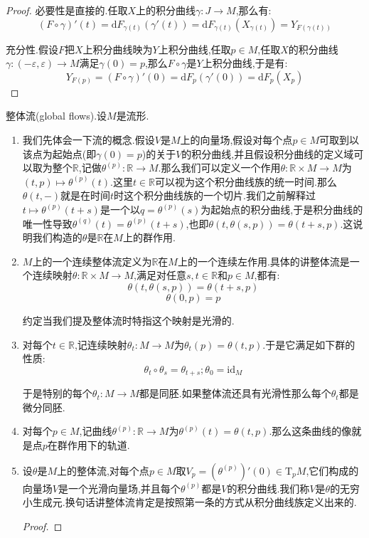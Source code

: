 \begin{enumerate}
\begin{proof}
		必要性是直接的.任取$X$上的积分曲线$\gamma:J\to M$,那么有:
		$$(F\circ\gamma)'(t)=\mathrm{d}F_{\gamma(t)}(\gamma'(t))=\mathrm{d}F_{\gamma(t)}(X_{\gamma(t)})=Y_{F(\gamma(t))}$$
		
		充分性.假设$F$把$X$上积分曲线映为$Y$上积分曲线,任取$p\in M$,任取$X$的积分曲线$\gamma:(-\varepsilon,\varepsilon)\to M$满足$\gamma(0)=p$,那么$F\circ\gamma$是$Y$上积分曲线,于是有:
		$$Y_{F(p)}=(F\circ\gamma)'(0)=\mathrm{d}F_p(\gamma'(0))=\mathrm{d}F_p(X_p)$$
	\end{proof}
\end{enumerate}

整体流(global flows).设$M$是流形.
\begin{enumerate}
	\item 我们先体会一下流的概念.假设$V$是$M$上的向量场,假设对每个点$p\in M$可取到以该点为起始点(即$\gamma(0)=p$)的关于$V$的积分曲线,并且假设积分曲线的定义域可以取为整个$\mathbb{R}$,记做$\theta^{(p)}:\mathbb{R}\to M$.那么我们可以定义一个作用$\theta:\mathbb{R}\times M\to M$为$(t,p)\mapsto\theta^{(p)}(t)$.这里$t\in\mathbb{R}$可以视为这个积分曲线族的统一时间.那么$\theta(t,-)$就是在时间$t$时这个积分曲线族的一个切片.我们之前解释过$t\mapsto\theta^{(p)}(t+s)$是一个以$q=\theta^{(p)}(s)$为起始点的积分曲线,于是积分曲线的唯一性导致$\theta^{(q)}(t)=\theta^{(p)}(t+s)$,也即$\theta(t,\theta(s,p))=\theta(t+s,p)$.这说明我们构造的$\theta$是$\mathbb{R}$在$M$上的群作用.
	\item $M$上的一个连续整体流定义为$\mathbb{R}$在$M$上的一个连续左作用.具体的讲整体流是一个连续映射$\theta:\mathbb{R}\times M\to M$,满足对任意$s,t\in\mathbb{R}$和$p\in M$,都有:
	$$\theta(t,\theta(s,p))=\theta(t+s,p)$$
	$$\theta(0,p)=p$$
	
	约定当我们提及整体流时特指这个映射是光滑的.
	\item 对每个$t\in\mathbb{R}$,记连续映射$\theta_t:M\to M$为$\theta_t(p)=\theta(t,p)$.于是它满足如下群的性质:$$\theta_t\circ\theta_s=\theta_{t+s};\theta_0=\mathrm{id}_M$$
	
	于是特别的每个$\theta_t:M\to M$都是同胚.如果整体流还具有光滑性那么每个$\theta_t$都是微分同胚.
	\item 对每个$p\in M$,记曲线$\theta^{(p)}:\mathbb{R}\to M$为$\theta^{(p)}(t)=\theta(t,p)$.那么这条曲线的像就是点$p$在群作用下的轨道.
	\item 设$\theta$是$M$上的整体流,对每个点$p\in M$取$V_p=(\theta^{(p)})'(0)\in\mathrm{T}_pM$,它们构成的向量场$V$是一个光滑向量场,并且每个$\theta^{(p)}$都是$V$的积分曲线.我们称$V$是$\theta$的无穷小生成元.换句话讲整体流肯定是按照第一条的方式从积分曲线族定义出来的.
	\begin{proof}
		

\end{proof}
\end{enumerate}
